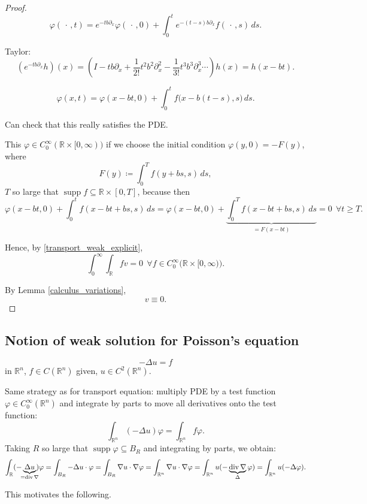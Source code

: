 \documentclass[12pt]{article}
\DeclareMathOperator{\diver}{div}
\DeclareMathOperator{\supp}{supp}
\theoremstyle{definition}
\begin{document}
\begin{proof}
\[\varphi(\,\cdot\,,t)=e^{-tb\partial_x}\varphi(\,\cdot\,,0)+\int_0^te^{-(t-s)b\partial_x}f(\,\cdot\,,s)\,ds.\]

Taylor:
\[(e^{-tb\partial_x}h)(x)=\left(I-tb\partial_x+\frac1{2!}t^2b^2\partial_x^2-\frac1{3!}t^3b^3\partial_x^3\cdots\right)h(x)=h(x-bt).\]

\[\varphi(x,t)=\varphi(x-bt,0)+\int_0^tf\big(x-b(t-s),s\big)\,ds.\]

Can check that this really satisfies the PDE.

This $\varphi\in C_0^\infty(\mathbb R\times[0,\infty))$ if we choose the initial condition $\varphi(y,0)=-F(y)$, where
\[F(y)\coloneqq\int_0^Tf(y+bs,s)\,ds,\]
$T$ so large that $\supp f\subseteq\mathbb R\times[0,T]$, because then
\[\varphi(x-bt,0)+\int_0^tf(x-bt+bs,s)\,ds=\varphi(x-bt,0)+\underbrace{\int_0^Tf(x-bt+bs,s)\,ds}_{=F(x-bt)}=0\ \ \forall t\geq T.\]

Hence, by \eqref{transport_weak_explicit},
\[\int_0^\infty\int_\mathbb Rfv=0 \ \ \forall f\in C_0^\infty\big(\mathbb R\times[0,\infty)\big).\]

By Lemma \ref{calculus_variations},
\[v\equiv0.\]
\end{proof}

\subsection*{Notion of weak solution for Poisson's equation}
\begin{equation}\tag{P}\label{Poisson_future_weak}
-\Delta u=f
\end{equation}
in $\mathbb R^n$, $f\in C(\mathbb R^n)$ given, $u\in C^2(\mathbb R^n)$.

Same strategy as for transport equation: multiply PDE by a test function $\varphi\in C_0^\infty(\mathbb R^n)$ and integrate by parts to move all derivatives onto the test function:
\[\int_{\mathbb R^n}(-\Delta u)\varphi=\int_{\mathbb R^n}f\varphi.\]
Taking $R$ so large that $\supp\varphi\subseteq B_R$ and integrating by parts, we obtain:
\[\int_{\mathbb R}(-\underbrace{\Delta u}_{\mathclap{=\diver\nabla}})\varphi=\int_{B_R}-\Delta u\cdot\varphi=\int_{B_R}\nabla u\cdot\nabla\varphi=\int_{\mathbb R^n}\nabla u\cdot\nabla\varphi=\int_{\mathbb R^n}u(-\underbrace{\diver\nabla}_\Delta\varphi)=\int_{\mathbb R^n}u(-\Delta\varphi).\]

This motivates the following.
\end{document}
